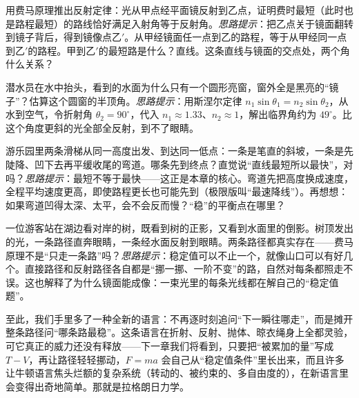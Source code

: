 \begin{puzzles}
\item 用费马原理推出反射定律：光从甲点经平面镜反射到乙点，证明费时最短（此时也是路程最短）的路线恰好满足入射角等于反射角。\emph{思路提示}：把乙点关于镜面翻转到镜子背后，得到镜像点乙$'$。从甲经镜面任一点到乙的路程，等于从甲经同一点到乙$'$的路程。甲到乙$'$的最短路是什么？直线。这条直线与镜面的交点处，两个角什么关系？
\item 潜水员在水中抬头，看到的水面为什么只有一个圆形亮窗，窗外全是黑亮的“镜子”？估算这个圆窗的半顶角。\emph{思路提示}：用斯涅尔定律 \(n_1\sin\theta_1=n_2\sin\theta_2\)，从水到空气，令折射角 \(\theta_2=90^{\circ}\)，代入 \(n_1\approx1.33\)、\(n_2\approx1\)，解出临界角约为 \(49^{\circ}\)。比这个角度更斜的光全部全反射，到不了眼睛。
\item 游乐园里两条滑梯从同一高度出发、到达同一低点：一条是笔直的斜坡，一条是先陡降、凹下去再平缓收尾的弯道。哪条先到终点？直觉说“直线最短所以最快”，对吗？\emph{思路提示}：最短不等于最快——这正是本章的核心。弯道先把高度换成速度，全程平均速度更高，即使路程更长也可能先到（极限版叫“最速降线”）。再想想：如果弯道凹得太深、太平，会不会反而慢？“稳”的平衡点在哪里？
\item 一位游客站在湖边看对岸的树，既看到树的正影，又看到水面里的倒影。树顶发出的光，一条路径直奔眼睛，一条经水面反射到眼睛。两条路径都真实存在——费马原理不是“只走一条路”吗？\emph{思路提示}：稳定值可以不止一个，就像山口可以有好几个。直接路径和反射路径各自都是“挪一挪、一阶不变”的路，自然对每条都照走不误。这也解释了为什么镜面能成像：一束光里的每条光线都在解自己的“稳定值题”。
\end{puzzles}

至此，我们手里多了一种全新的语言：不再逐时刻追问“下一瞬往哪走”，而是摊开整条路径问“哪条路最稳”。这条语言在折射、反射、抛体、晾衣绳身上全都灵验，可它真正的威力还没有释放——下一章我们将看到，只要把“被累加的量”写成 \(T-V\)，再让路径轻轻挪动，\(F=ma\) 会自己从“稳定值条件”里长出来，而且许多让牛顿语言焦头烂额的复杂系统（转动的、被约束的、多自由度的），在新语言里会变得出奇地简单。那就是拉格朗日力学。
